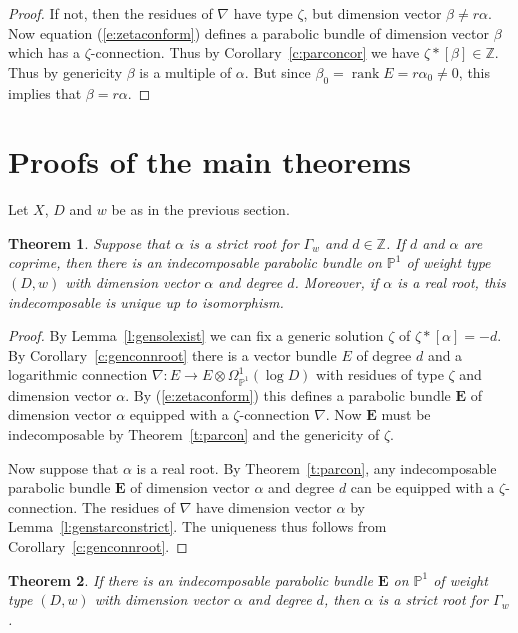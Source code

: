\documentclass{amsart}
\theoremstyle{plain}
\newtheorem{thm}{Theorem}[section]
\theoremstyle{definition}
\theoremstyle{remark}
\newcommand{\Z}{\mathbb{Z}}
\newcommand{\PP}{\mathbb{P}}
\DeclareMathOperator{\rank}{rank}
\newcommand{\E}{\mathbf{E}}
\begin{document}
\begin{proof}
If not, then the residues of $\nabla$ have type $\zeta$, but dimension vector $\beta\neq r\alpha$.
Now equation (\ref{e:zetaconform}) defines a parabolic bundle of dimension vector $\beta$
which has a $\zeta$-connection. Thus by
Corollary~\ref{c:parconcor} we have $\zeta*[\beta]\in\Z$.
Thus by genericity $\beta$ is a multiple of $\alpha$. But since $\beta_0=\rank E = r\alpha_0 \neq 0$,
this implies that $\beta=r\alpha$.
\end{proof}





\section{Proofs of the main theorems}\label{s:mainproofs}
Let $X$, $D$ and $w$ be as in the previous section.

\begin{thm}\label{t:indivparexist}
Suppose that $\alpha$ is a strict root for $\Gamma_w$ and $d\in\Z$.
If $d$ and $\alpha$ are coprime, then there is an
indecomposable parabolic bundle on $\PP^1$ of weight type $(D,w)$ with dimension vector
$\alpha$ and degree $d$.
Moreover, if $\alpha$ is a real root, this indecomposable is
unique up to isomorphism.
\end{thm}


\begin{proof}
By Lemma~\ref{l:gensolexist} we can fix a generic solution $\zeta$ of $\zeta*[\alpha]=-d$.
By Corollary~\ref{c:genconnroot} there is a
vector bundle $E$ of degree $d$ and a logarithmic
connection $\nabla:E\to E\otimes \Omega^1_{\PP^1}(\log D)$
with residues of type $\zeta$ and dimension vector $\alpha$.
By (\ref{e:zetaconform}) this defines a parabolic bundle
$\E$ of dimension vector $\alpha$ equipped with a $\zeta$-connection $\nabla$.
Now $\E$ must be indecomposable by Theorem~\ref{t:parcon} and the genericity of $\zeta$.

Now suppose that $\alpha$ is a real root. By Theorem~\ref{t:parcon}, any indecomposable
parabolic bundle $\mathbf{E}$ of dimension vector $\alpha$ and degree $d$
can be equipped with a $\zeta$-connection.
The residues of $\nabla$ have dimension vector $\alpha$ by Lemma~\ref{l:genstarconstrict}.
The uniqueness thus follows from Corollary~\ref{c:genconnroot}.
\end{proof}


\begin{thm}\label{t:starbunisroot}
If there is an indecomposable parabolic bundle $\E$ on $\PP^1$ of weight type $(D,w)$
with dimension vector $\alpha$ and degree $d$, then $\alpha$ is
a strict root for $\Gamma_w$.
\end{thm}
\end{document}
